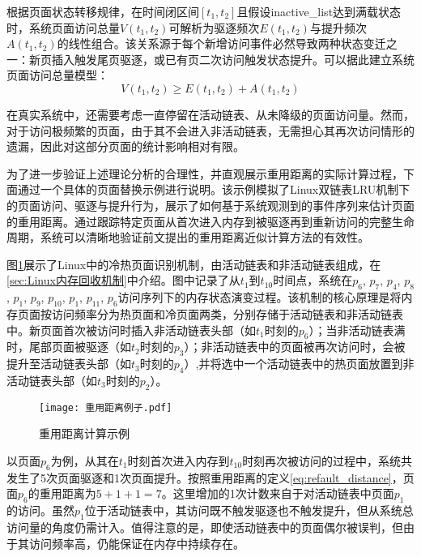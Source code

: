 根据页面状态转移规律，在时间闭区间$[t_1, t_2]$且假设inactive\_list达到满载状态时，系统页面访问总量$V(t_1, t_2)$可解析为驱逐频次$E(t_1, t_2)$与提升频次$A(t_1, t_2)$的线性组合。该关系源于每个新增访问事件必然导致两种状态变迁之一：新页插入触发尾页驱逐，或已有页二次访问触发状态提升。可以据此建立系统页面访问总量模型：
\[
V(t_1, t_2) \geq E(t_1,t_2) + A(t_1,t_2)
\]

在真实系统中，还需要考虑一直停留在活动链表、从未降级的页面访问量。然而，对于访问极频繁的页面，由于其不会进入非活动链表，无需担心其再次访问情形的遗漏，因此对这部分页面的统计影响相对有限。

为了进一步验证上述理论分析的合理性，并直观展示重用距离的实际计算过程，下面通过一个具体的页面替换示例进行说明。该示例模拟了Linux双链表LRU机制下的页面访问、驱逐与提升行为，展示了如何基于系统观测到的事件序列来估计页面的重用距离。通过跟踪特定页面从首次进入内存到被驱逐再到重新访问的完整生命周期，系统可以清晰地验证前文提出的重用距离近似计算方法的有效性。

图\ref{fig:page_replacement_example}展示了Linux中的冷热页面识别机制，由活动链表和非活动链表组成，在\ref{sec:Linux内存回收机制}中介绍。图中记录了从$t_1$到$t_{10}$时间点，系统在\(p_6\), \(p_7\), \(p_4\), \(p_8\), \(p_1\), \(p_9\), \(p_{10}\), \(p_1\), \(p_{11}\), \(p_6\)访问序列下的内存状态演变过程。该机制的核心原理是将内存页面按访问频率分为热页面和冷页面两类，分别存储于活动链表和非活动链表中。新页面首次被访问时插入非活动链表头部（如$t_1$时刻的\(p_6\)）；当非活动链表满时，尾部页面被驱逐（如\(t_2\)时刻的$p_3$）；非活动链表中的页面被再次访问时，会被提升至活动链表头部（如$t_3$时刻的$p_4$）,并将选中一个活动链表中的热页面放置到非活动链表头部（如$t_3$时刻的$p_2$）。

\begin{figure}[htbp]
  \centering
  \texttt{[image: 重用距离例子.pdf]}
  \caption{重用距离计算示例}
  \label{fig:page_replacement_example}
\end{figure}
以页面$p_6$为例，从其在$t_1$时刻首次进入内存到$t_{10}$时刻再次被访问的过程中，系统共发生了5次页面驱逐和1次页面提升。按照重用距离的定义\ref{eq:refault_distance}，页面$p_6$的重用距离为$5+1+1=7$。这里增加的1次计数来自于对活动链表中页面$p_1$的访问。虽然$p_1$位于活动链表中，其访问既不触发驱逐也不触发提升，但从系统总访问量的角度仍需计入。值得注意的是，即使活动链表中的页面偶尔被误判，但由于其访问频率高，仍能保证在内存中持续存在。

